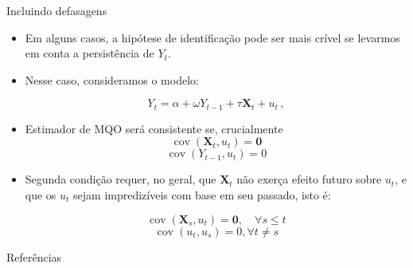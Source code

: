 \documentclass[11pt]{beamer}
\begin{document}
			\begin{frame}{Incluindo defasagens}
				\begin{itemize}
					\item Em alguns casos, a hipótese de identificação pode ser mais crível se levarmos em conta a persistência de $Y_t$.
					\item Nesse caso, consideramos o modelo:
					
					$$Y_t = \alpha + \omega Y_{t-1} + \tau \boldsymbol{X}_{t}+ u_t\, ,$$
					\item Estimador de MQO será consistente se, crucialmente
$$\operatorname{cov}(\boldsymbol{X}_t, u_t) = \boldsymbol{0}$$
$$\operatorname{cov}(Y_{t-1}, u_t)=0$$
\item Segunda condição requer, no geral, que $\boldsymbol{X}_t$ não exerça efeito futuro sobre $u_t$, e que os $u_t$ sejam impredizíveis com base em seu passado, isto é:

$$\operatorname{cov}(\boldsymbol{X}_s, u_t)= \boldsymbol{0}, \quad \forall s \leq t$$
$$\operatorname{cov}(u_t,u_s)=0, \forall t \neq s$$
				\end{itemize}
			\end{frame}
\appendix
\begin{frame}[allowframebreaks]{Referências}
	\printbibliography
\end{frame}
\end{document}
